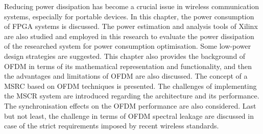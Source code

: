 Reducing power dissipation has become a crucial issue in wireless communication systems, especially for portable devices.
In this chapter, the power consumption of FPGA systems is discussed.
The power estimation and analysis tools of Xilinx are also studied and employed in this research to evaluate the power dissipation of the researched system for power consumption optimisation.
Some low-power design strategies are suggested.
This chapter also provides the background of OFDM in terms of its mathematical representation and functionality, and then the advantages and limitations of OFDM are also discussed.
The concept of a MSRC based on OFDM techniques is presented. The challenges of implementing the MSCR system are introduced regarding the architecture and its performance.
The synchronisation effects on the OFDM performance are also considered.
Last but not least, the challenge in terms of OFDM spectral leakage are discussed in case of the strict requirements imposed by recent wireless standards.
